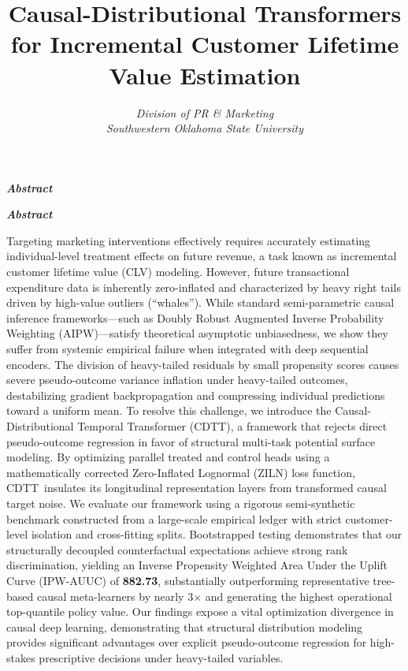 \documentclass[10pt, conference]{IEEEtran}
\newcommand{\ourmodel}{CDTT}
\renewenvironment{abstract}{%
    \ifCLASSOPTIONtwocolumn
      \small\itshape\textbf{Abstract}\space %
    \else
      \begin{center}\small\itshape\textbf{Abstract}\end{center}\quotation
    \fi
}{\ifCLASSOPTIONtwocolumn\else\endquotation\fi}
\begin{document}
\title{Causal-Distributional Transformers for Incremental Customer Lifetime Value Estimation}

\author{
\textit{Division of PR \& Marketing} \\
\textit{Southwestern Oklahoma State University}\\
}

\maketitle
\thispagestyle{plain}
\pagestyle{plain}

\begin{abstract}
\normalfont Targeting marketing interventions effectively requires accurately estimating individual-level treatment effects on future revenue, a task known as incremental customer lifetime value (CLV) modeling. However, future transactional expenditure data is inherently zero-inflated and characterized by heavy right tails driven by high-value outliers (``whales''). While standard semi-parametric causal inference frameworks—such as Doubly Robust Augmented Inverse Probability Weighting (AIPW)—satisfy theoretical asymptotic unbiasedness, we show they suffer from systemic empirical failure when integrated with deep sequential encoders. The division of heavy-tailed residuals by small propensity scores causes severe pseudo-outcome variance inflation under heavy-tailed outcomes, destabilizing gradient backpropagation and compressing individual predictions toward a uniform mean. To resolve this challenge, we introduce the Causal-Distributional Temporal Transformer (\ourmodel), a framework that rejects direct pseudo-outcome regression in favor of structural multi-task potential surface modeling. By optimizing parallel treated and control heads using a mathematically corrected Zero-Inflated Lognormal (ZILN) loss function, \ourmodel\ insulates its longitudinal representation layers from transformed causal target noise. We evaluate our framework using a rigorous semi-synthetic benchmark constructed from a large-scale empirical ledger with strict customer-level isolation and cross-fitting splits. Bootstrapped testing demonstrates that our structurally decoupled counterfactual expectations achieve strong rank discrimination, yielding an Inverse Propensity Weighted Area Under the Uplift Curve (IPW-AUUC) of \textbf{882.73}, substantially outperforming representative tree-based causal meta-learners by nearly 3$\times$ and generating the highest operational top-quantile policy value. Our findings expose a vital optimization divergence in causal deep learning, demonstrating that structural distribution modeling provides significant advantages over explicit pseudo-outcome regression for high-stakes prescriptive decisions under heavy-tailed variables.
\end{abstract}
\end{document}
